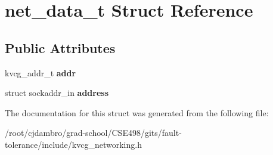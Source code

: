 \hypertarget{structnet__data__t}{\section{net\-\_\-data\-\_\-t Struct Reference}
\label{structnet__data__t}
}
\subsection*{Public Attributes}
\begin{DoxyCompactItemize}
\item 
\hypertarget{structnet__data__t_a0e5c2721737d5f43e82a83823ba0d13c}{kvcg\-\_\-addr\-\_\-t {\bfseries addr}}\label{structnet__data__t_a0e5c2721737d5f43e82a83823ba0d13c}

\item 
\hypertarget{structnet__data__t_ab33e9a34a6b9c24faecc30e850d5960a}{struct sockaddr\-\_\-in {\bfseries address}}\label{structnet__data__t_ab33e9a34a6b9c24faecc30e850d5960a}

\end{DoxyCompactItemize}


The documentation for this struct was generated from the following file\-:\begin{DoxyCompactItemize}
\item 
/root/cjdambro/grad-\/school/\-C\-S\-E498/gits/fault-\/tolerance/include/kvcg\-\_\-networking.\-h\end{DoxyCompactItemize}
